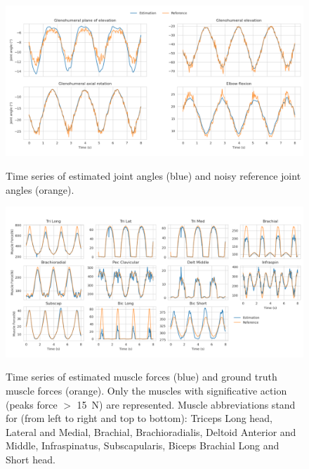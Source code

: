  
\begin{figure}[t!] 
\centering 
\includegraphics[width=\textwidth]{figures/joint_angles_MHE.pdf}\\ 
\caption{Time series of estimated joint angles (blue) and noisy reference joint angles (orange).} 
\label{fig:joint_angles_MHE} 
\end{figure} 

\begin{figure}[t!] 
\centering 
\includegraphics[width=\textwidth]{figures/Muscle_Forces_MHE.pdf}\\ 
\caption{Time series of estimated muscle forces (blue) and ground truth muscle forces (orange). 
Only the muscles with significative action (peaks force $>$ 15~N) are represented.
Muscle abbreviations stand for (from left to right and top to bottom): Triceps Long head, Lateral and Medial, Brachial, Brachioradialis, Deltoid Anterior and Middle, Infraspinatus, Subscapularis, Biceps Brachial Long and Short head.} 
\label{fig:muscle_forces_MHE} 
\end{figure}
